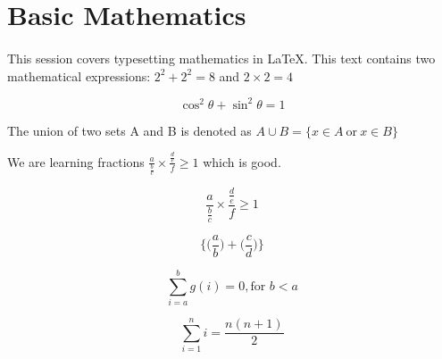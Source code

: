 \documentclass{article}
\begin{document}
	
	\section{Basic Mathematics}
    \paragraph{}
    This session covers typesetting mathematics in LaTeX. This text contains two mathematical expressions: $ 2^{2} + 2^{2} = 8$ and $ 2 \times 2 = 4$
    
    \[  \cos^2 \theta + \sin^2 \theta = 1 \]
    
    The union of two sets A and B is denoted as 
    $ A \cup B = \{ x \in A \ \text{or} \ x \in B \} $
    
    We are learning fractions $ \frac{a}{ \frac{b}{c} } \times \frac{\frac{d}{e}}{f} \geq 1 $ which is good.
    
    \[ \frac{a}{ \frac{b}{c} } \times \frac{\frac{d}{e}}{f} \geq 1 \]
    
    \[ \Bigg\{ \bigg(\frac{a}{b}\bigg) + \bigg(\frac{c}{d}\bigg) \Bigg\} \]
    
    \[ \sum_{i=a}^{b} g(i) = 0, \text{for } b < a  \]
    
    \[ \sum_{i=1}^{n} i = \frac{n(n+1)}{2} \]
\end{document}
